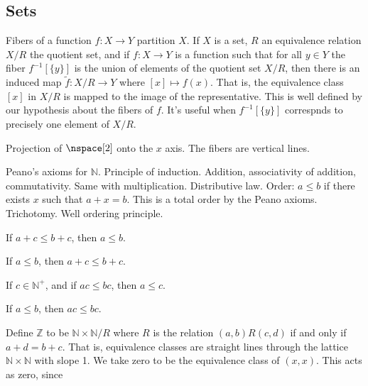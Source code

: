 \documentclass{article}                                                        %
\begin{document}
        \subsection{Sets}
            Fibers of a function $f:X\rightarrow{Y}$ partition $X$.
            If $X$ is a set, $R$ an equivalence relation $X/R$ the quotient set,
            and if $f:X\rightarrow{Y}$ is a function such that for all $y\in{Y}$
            the fiber $f^{\minus{1}}[\{y\}]$ is the union of elements of the
            quotient set $X/R$, then there is an induced map
            $\tilde{f}:X/R\rightarrow{Y}$ where $[x]\mapsto{f}(x)$. That is,
            the equivalence class $[x]$ in $X/R$ is mapped to the image of
            the representative. This is well defined by our hypothesis about the
            fibers of $f$. It's useful when $f^{\minus{1}}[\{y\}]$ correspnds to
            precisely one element of $X/R$.
            \begin{example}
                Projection of $\nspace[2]$ onto the $x$ axis. The fibers are
                vertical lines.
            \end{example}
            Peano's axioms for $\mathbb{N}$. Principle of induction. Addition,
            associativity of addition, commutativity. Same with multiplication.
            Distributive law. Order: $a\leq{b}$ if there exists $x$ such that
            $a+x=b$. This is a total order by the Peano axioms. Trichotomy.
            Well ordering principle.
            \begin{theorem}
                If $a+c\leq{b}+c$, then $a\leq{b}$.
            \end{theorem}
            \begin{theorem}
                If $a\leq{b}$, then $a+c\leq{b}+c$.
            \end{theorem}
            \begin{theorem}
                If $c\in\mathbb{N}^{+}$, and if $ac\leq{b}c$, then $a\leq{c}$.
            \end{theorem}
            \begin{theorem}
                If $a\leq{b}$, then $ac\leq{b}c$.
            \end{theorem}
            Define $\mathbb{Z}$ to be $\mathbb{N}\times\mathbb{N}/R$ where $R$
            is the relation $(a,b)R(c,d)$ if and only if $a+d=b+c$. That is,
            equivalence classes are straight lines through the lattice
            $\mathbb{N}\times\mathbb{N}$ with slope 1. We take zero to be the
            equivalence class of $(x,x)$. This acts as zero, since
\end{document}

